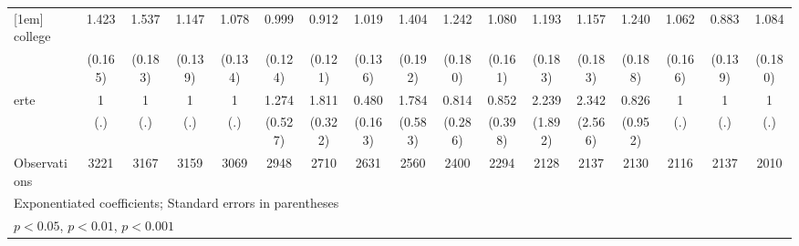 {\begin{tabular}{l*{16}{c}}
[1em]
college             &       1.423\sym{**} &       1.537\sym{***}&       1.147         &       1.078         &       0.999         &       0.912         &       1.019         &       1.404\sym{*}  &       1.242         &       1.080         &       1.193         &       1.157         &       1.240         &       1.062         &       0.883         &       1.084         \\
                    &     (0.165)         &     (0.183)         &     (0.139)         &     (0.134)         &     (0.124)         &     (0.121)         &     (0.136)         &     (0.192)         &     (0.180)         &     (0.161)         &     (0.183)         &     (0.183)         &     (0.188)         &     (0.166)         &     (0.139)         &     (0.180)         \\
[1em]
erte                &           1         &           1         &           1         &           1         &       1.274         &       1.811\sym{***}&       0.480\sym{*}  &       1.784         &       0.814         &       0.852         &       2.239         &       2.342         &       0.826         &           1         &           1         &           1         \\
                    &         (.)         &         (.)         &         (.)         &         (.)         &     (0.527)         &     (0.322)         &     (0.163)         &     (0.583)         &     (0.286)         &     (0.398)         &     (1.892)         &     (2.566)         &     (0.952)         &         (.)         &         (.)         &         (.)         \\
\hline
Observations        &        3221         &        3167         &        3159         &        3069         &        2948         &        2710         &        2631         &        2560         &        2400         &        2294         &        2128         &        2137         &        2130         &        2116         &        2137         &        2010         \\
\hline\hline
\multicolumn{17}{l}{\footnotesize Exponentiated coefficients; Standard errors in parentheses}\\
\multicolumn{17}{l}{\footnotesize \sym{*} \(p<0.05\), \sym{**} \(p<0.01\), \sym{***} \(p<0.001\)}\\
\end{tabular}
}
